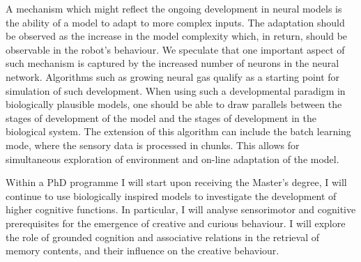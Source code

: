A mechanism which might reflect the ongoing development in neural models is the ability of a model to adapt to more complex inputs.
The adaptation should be observed as the increase in the model complexity which, in return, should be observable in the robot's behaviour. We speculate that one important aspect of such mechanism is captured by the increased number of neurons in the neural network.
Algorithms such as growing neural gas qualify as a starting point for simulation of such development. When using such a developmental paradigm in biologically plausible models, one should be able to draw parallels between the stages of development of the model and the stages of development in the biological system. The extension of this algorithm can include the batch learning mode, where the sensory data is processed in chunks. This allows for simultaneous exploration of environment and on-line adaptation of the model.

Within a PhD programme I will start upon receiving the Master's degree, I will continue to use biologically inspired models to investigate the development of higher cognitive functions. In particular, I will analyse sensorimotor and cognitive prerequisites for the emergence of creative and curious behaviour. I will explore the role of grounded cognition and associative relations in the retrieval of memory contents, and their influence on the creative behaviour.
